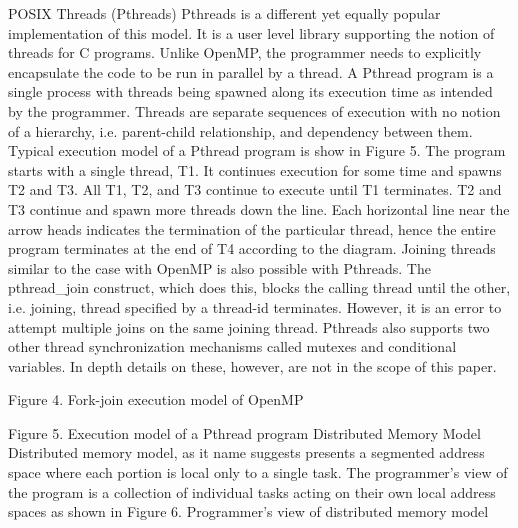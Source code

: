 POSIX Threads (Pthreads)
Pthreads is a different yet equally popular implementation of this model. It is a user level library supporting the notion of threads for C programs. Unlike OpenMP, the programmer needs to explicitly encapsulate the code to be run in parallel by a thread. A Pthread program is a single process with threads being spawned along its execution time as intended by the programmer. Threads are separate sequences of execution with no notion of a hierarchy, i.e. parent-child relationship, and dependency between them. Typical execution model of a Pthread program is show in Figure 5.
The program starts with a single thread, T1. It continues execution for some time and spawns T2 and T3. All T1, T2, and T3 continue to execute until T1 terminates. T2 and T3 continue and spawn more threads down the line. Each horizontal line near the arrow heads indicates the termination of the particular thread, hence the entire program terminates at the end of T4 according to the diagram. 
Joining threads similar to the case with OpenMP is also possible with Pthreads. The pthread_join construct, which does this, blocks the calling thread until the other, i.e. joining, thread specified by a thread-id terminates. However, it is an error to attempt multiple joins on the same joining thread.  Pthreads also supports two other thread synchronization mechanisms called mutexes and conditional variables. In depth details on these, however, are not in the scope of this paper.

 
Figure 4. Fork-join execution model of OpenMP

Figure 5. Execution model of a Pthread program
Distributed Memory Model
Distributed memory model, as it name suggests presents a segmented address space where each portion is local only to a single task. The programmer’s view of the program is a collection of individual tasks acting on their own local address spaces as shown in Figure 6. Programmer's view of distributed memory model
 
